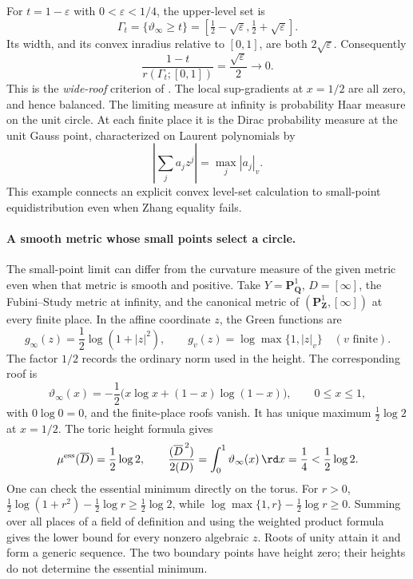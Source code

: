 For $t=1-\varepsilon$ with $0<\varepsilon<1/4$, the upper-level set is
\[
 \Gamma_t=\{\vartheta_\infty\geq t\}
     =[\tfrac12-\sqrt\varepsilon,\tfrac12+\sqrt\varepsilon].
\]
Its width, and its convex inradius relative to $[0,1]$, are both
$2\sqrt\varepsilon$. Consequently
\[
              \frac{1-t}{r(\Gamma_t;[0,1])}
                            =\frac{\sqrt\varepsilon}{2}\longrightarrow0.
\]
This is the \emph{wide-roof} criterion of
\cite[Theorem~8.7 and Proposition~A.3]{BallaySombra26Published}.
The local sup-gradients at $x=1/2$ are all zero, and hence balanced.
The limiting measure at infinity is probability Haar measure on
the unit circle. At each finite place it is the Dirac probability
measure at the unit Gauss point, characterized on Laurent
polynomials by
\[
                    \left|\sum_j a_jz^j\right|=\max_j|a_j|_v.
\]
This example connects an explicit convex level-set calculation to
small-point equidistribution even when Zhang equality fails.

\paragraph{A smooth metric whose small points select a circle.}
The small-point limit can differ from the curvature measure of the
given metric even when that metric is smooth and positive.
Take $Y=\mathbf P^1_{\mathbf Q}$, $D=[\infty]$, the Fubini--Study
metric at infinity, and the canonical metric of
$(\mathbf P^1_{\mathbf Z},[\infty])$ at every finite place.
In the affine coordinate $z$, the Green functions are
\[
 g_\infty(z)=\frac12\log(1+|z|^2),\qquad
 g_v(z)=\log\max\{1,|z|_v\}\quad(v\text{ finite}).
\]
The factor $1/2$ records the ordinary norm used in the height.
The corresponding roof is
\[
 \vartheta_\infty(x)
    =-\frac12\bigl(x\log x+(1-x)\log(1-x)\bigr),
       \qquad 0\leq x\leq1,
\]
with $0\log0=0$, and the finite-place roofs vanish.
It has unique maximum $\frac12\log2$ at $x=1/2$.
The toric height formula gives
\[
 \mu^{\mathrm{ess}}(\overline D)=\frac12\log2,
 \qquad
 \frac{(\overline D^{\,2})}{2(D)}
        =\int_0^1\vartheta_\infty(x)\,\rd x
        =\frac14<\frac12\log2.
\]
One can check the essential minimum directly on the torus.
For $r>0$,
$\frac12\log(1+r^2)-\frac12\log r\geq\frac12\log2$,
while
$\log\max\{1,r\}-\frac12\log r\geq0$.
Summing over all places of a field of definition and using the
weighted product formula gives the lower bound for every nonzero
algebraic $z$. Roots of unity attain it and form a generic sequence.
The two boundary points have height zero; their heights do not
determine the essential minimum.


